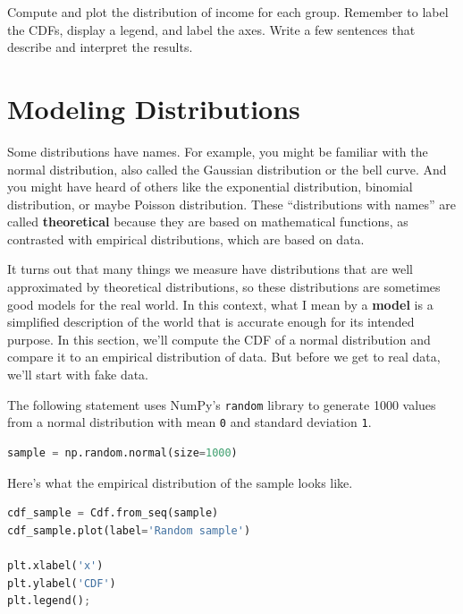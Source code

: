Compute and plot the distribution of income for each group. Remember to
label the CDFs, display a legend, and label the axes. Write a few
sentences that describe and interpret the results.

\hypertarget{modeling-distributions}{%
\section{Modeling Distributions}\label{modeling-distributions}}

Some distributions have names. For example, you might be familiar with
the normal distribution, also called the Gaussian distribution or the
bell curve. And you might have heard of others like the exponential
distribution, binomial distribution, or maybe Poisson distribution.
These ``distributions with names'' are called \textbf{theoretical}
because they are based on mathematical functions, as contrasted with
empirical distributions, which are based on data.

It turns out that many things we measure have distributions that are
well approximated by theoretical distributions, so these distributions
are sometimes good models for the real world. In this context, what I
mean by a \textbf{model} is a simplified description of the world that
is accurate enough for its intended purpose. In this section, we'll
compute the CDF of a normal distribution and compare it to an empirical
distribution of data. But before we get to real data, we'll start with
fake data.

The following statement uses NumPy's \passthrough{\lstinline!random!}
library to generate 1000 values from a normal distribution with mean
\passthrough{\lstinline!0!} and standard deviation
\passthrough{\lstinline!1!}.

\begin{lstlisting}[language=Python,style=source]
sample = np.random.normal(size=1000)
\end{lstlisting}

Here's what the empirical distribution of the sample looks like.

\begin{lstlisting}[language=Python,style=source]
cdf_sample = Cdf.from_seq(sample)
cdf_sample.plot(label='Random sample')

plt.xlabel('x')
plt.ylabel('CDF')
plt.legend();
\end{lstlisting}

